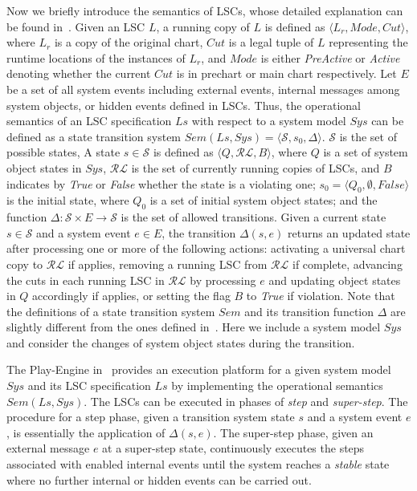 \documentclass[]{llncs}
\begin{document}
Now we briefly introduce the semantics of LSCs,
whose detailed explanation can be found in~\cite{HM03}.
Given an LSC $L$, a running copy of $L$ is defined as
$\langle L_r, Mode, Cut\rangle$, where $L_r$ is a copy of the
original chart,
$Cut$ is a legal tuple of $L$ representing
the runtime locations of the instances of $L_r$,
and $Mode$ is either {\em PreActive} or
{\em Active} denoting whether the current $Cut$
is in prechart or main chart respectively.
Let $E$ be a set of all system events including
external events, internal messages among system objects, or
hidden events defined in LSCs.
Thus, the operational semantics of an LSC specification
$Ls$ with respect to a system model $Sys$ can be defined as a state
transition system $Sem(Ls, Sys) = \langle \mathcal{S}, s_0, \Delta\rangle$.
$\mathcal{S}$ is the set of possible states,
A state $s \in \mathcal{S}$ is defined as
$\langle Q, \mathcal{RL}, B\rangle$, where
$Q$ is a set of system object states in $Sys$,
$\mathcal{RL}$ is the set of currently running copies of LSCs, and $B$ indicates
by {\em True} or {\em False} whether the state is a violating one;
$s_0 = \langle Q_0, \emptyset, False\rangle$ is the initial state, where
$Q_0$ is a set of initial system object states; and
the function $\Delta: \mathcal{S} \times E \rightarrow \mathcal{S}$ is
the set of allowed transitions.
Given a current state $s \in \mathcal{S}$ and a system event
$e \in E$, the transition $\Delta(s,e)$ returns an updated state after
processing one or more of the following actions:
activating a universal chart copy to $\mathcal{RL}$ if applies,
removing a running LSC from $\mathcal{RL}$ if complete,
advancing the cuts in each running LSC in $\mathcal{RL}$ by processing $e$
and updating object states in $Q$ accordingly if applies, or setting the flag
$B$ to {\em True} if violation.
Note that the definitions of a state transition system $Sem$ and its transition
function $\Delta$ are slightly different from the ones defined in~\cite{HM03}.
Here we include a system model $Sys$ and consider the changes of system object states
during the transition.

The Play-Engine in~\cite{HM03} provides an execution
platform for a given system model $Sys$ and its LSC specification $Ls$
by implementing the operational semantics $Sem(Ls, Sys)$.
The LSCs can be executed in phases of {\em step} and
{\em super-step}. The procedure for a step phase, given a transition system
state $s$ and a system event $e$, is essentially the application of $\Delta(s,e)$.
The super-step phase, given an external message $e$ at a super-step state,
continuously executes the steps associated with enabled internal events
until the system reaches a {\em stable} state where
no further internal or hidden events can be carried out.
\end{document}
